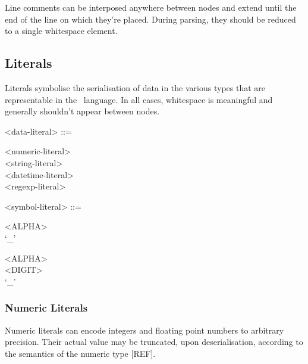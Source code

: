 Line comments can be interposed anywhere between nodes and extend until
the end of the line on which they're placed. During parsing, they should
be reduced to a single whitespace element.

\subsection{Literals}

Literals symbolise the serialisation of data in the various types that
are representable in the \stag\ language. In all cases, whitespace is
meaningful and generally shouldn't appear between nodes.

\begin{grammar}
  <data-literal> ::= \begin{syntdiag}
    \begin{stack}
      <numeric-literal> \\
      <string-literal> \\
      <datetime-literal> \\
      <regexp-literal>
    \end{stack}
  \end{syntdiag}

  <symbol-literal> ::= \begin{syntdiag}
    \begin{stack}
      <ALPHA> \\
      `_'
    \end{stack}
    \begin{rep}
      \begin{stack}
        <ALPHA> \\
        <DIGIT> \\
        `_'
      \end{stack}
    \end{rep}
  \end{syntdiag}
\end{grammar}

\subsubsection{Numeric Literals}

Numeric literals can encode integers and floating point numbers to
arbitrary precision. Their actual value may be truncated, upon
deserialisation, according to the semantics of the numeric type [REF].

